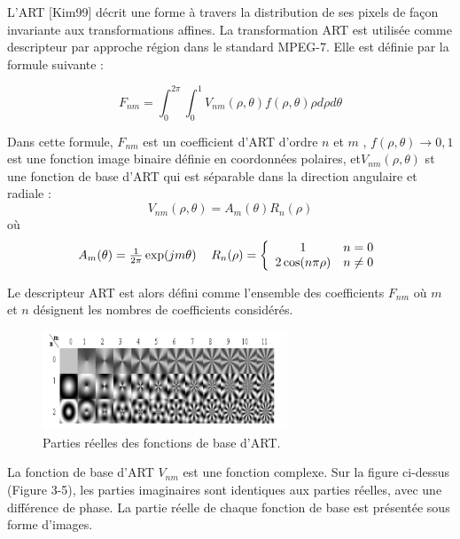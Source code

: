 L’ART [Kim99] décrit une forme à travers la distribution de ses pixels de façon invariante
aux transformations affines. La transformation ART est utilisée comme descripteur par approche
région dans le standard MPEG-7. Elle est définie par la formule suivante :

\begin{equation}
    F_{nm} = {\int }_0^{2\pi} {\int }_0^{1} V_{nm}(\rho, \theta) f(\rho, \theta) \rho d\rho  d\theta
\end{equation}

Dans cette formule, $ F_{nm} $ est un coefficient d’ART d’ordre $ n $ et $ m $ , $ f(\rho, \theta) \longrightarrow {0,1} $ est une fonction image binaire définie en coordonnées polaires, et$  V_{nm}(\rho, \theta) $ st une fonction de base d’ART qui est séparable dans la direction angulaire et radiale :
\begin{equation}
	V_{nm}(\rho, \theta)= A_m(\theta) R_n(\rho) 
\end{equation}
où
\begin{equation}
\begin{tabular}{cc}
 $ A_m(\theta) =\frac{1}{2\pi}\exp(jm\theta) $ 
    & $ R_n(\rho) = \left\{
    \begin{array}{cc} 
    1 & n=0 \\ 2\cos( n \pi \rho) 
    & n \neq 0  \end{array} \right. $ 
\end{tabular}
\end{equation}

Le descripteur ART est alors défini comme l’ensemble des coefficients $ F_{nm} $ où $ m $ et $ n $ désignent les nombres de coefficients considérés.

 \begin{figure}[H]
	\label{fig:art}
	\centering
	\includegraphics[width=0.65\textwidth]{Figures/art} %
	
	\caption{Parties réelles des fonctions de base d’ART.}
	
\end{figure}

La fonction de base d’ART $ V_{nm} $ est une fonction complexe. Sur la figure ci-dessus (Figure 3-5), les parties imaginaires sont identiques aux parties réelles, avec une différence de phase. La partie réelle de chaque fonction de base est présentée sous forme d’images.\\

